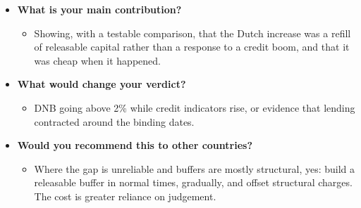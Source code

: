 \documentclass[10pt]{article}
\begin{document}
\begin{tcolorbox}[sbox,width=0.495\linewidth,height=14.6cm,nobeforeafter,box align=top,fit basedim=11pt,colframe=nlred!70,colbacktitle=nlred!8,coltitle=nlred,title=LIKELY CHALLENGES · definitions and logic]
\begin{itemize}
\item[\textcolor{navy}{\textbf{Q}}] \textbf{What is your main contribution?}
\begin{itemize}
\item Showing, with a testable comparison, that the Dutch increase was a refill of releasable capital rather than a response to a credit boom, and that it was cheap when it happened.
\end{itemize}
\item[\textcolor{navy}{\textbf{Q}}] \textbf{What would change your verdict?}
\begin{itemize}
\item DNB going above 2\% while credit indicators rise, or evidence that lending contracted around the binding dates.
\end{itemize}
\item[\textcolor{navy}{\textbf{Q}}] \textbf{Would you recommend this to other countries?}
\begin{itemize}
\item Where the gap is unreliable and buffers are mostly structural, yes: build a releasable buffer in normal times, gradually, and offset structural charges. The cost is greater reliance on judgement.
\end{itemize}
\end{itemize}
\end{tcolorbox}
\newpage
\end{document}
